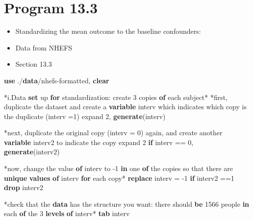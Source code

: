 \documentclass[
  10pt,
]{book}
\newenvironment{Shaded}{\begin{snugshade}}{\end{snugshade}}
\newcommand{\KeywordTok}[1]{\textcolor[rgb]{0.13,0.29,0.53}{\textbf{#1}}}
\newcommand{\NormalTok}[1]{#1}
\newcommand{\OtherTok}[1]{\textcolor[rgb]{0.56,0.35,0.01}{#1}}
\providecommand{\tightlist}{%
  \setlength{\itemsep}{0pt}\setlength{\parskip}{0pt}}
\begin{document}
\hypertarget{program-13.3-1}{%
\section{Program 13.3}\label{program-13.3-1}}

\begin{itemize}
\tightlist
\item
  Standardizing the mean outcome to the baseline confounders:
\item
  Data from NHEFS
\item
  Section 13.3
\end{itemize}

\begin{Shaded}
\begin{Highlighting}[]
\KeywordTok{use}\NormalTok{ ./}\KeywordTok{data}\NormalTok{/nhefs{-}formatted, }\KeywordTok{clear}

\NormalTok{*i.Data }\KeywordTok{set}\NormalTok{ up }\KeywordTok{for}\NormalTok{ standardization: create 3 copies }\KeywordTok{of}\NormalTok{ each subject*}
\NormalTok{*first, duplicate the dataset and create a }\KeywordTok{variable}\NormalTok{ \textquotesingle{}interv\textquotesingle{} which indicates which copy is the duplicate (interv =1)}
\NormalTok{expand 2, }\KeywordTok{generate}\NormalTok{(interv)}

\NormalTok{*next, duplicate the original copy (interv = 0) again, and create another }\KeywordTok{variable}\NormalTok{ \textquotesingle{}interv2\textquotesingle{} to indicate the copy}
\NormalTok{expand 2 }\KeywordTok{if}\NormalTok{ interv == 0, }\KeywordTok{generate}\NormalTok{(interv2)}

\NormalTok{*now, change the }\OtherTok{value} \KeywordTok{of}\NormalTok{ \textquotesingle{}interv\textquotesingle{} to {-}1 }\KeywordTok{in}\NormalTok{ one }\KeywordTok{of}\NormalTok{ the copies so that there are }\KeywordTok{unique} \KeywordTok{values} \KeywordTok{of}\NormalTok{ interv }\KeywordTok{for}\NormalTok{ each copy*}
\KeywordTok{replace}\NormalTok{ interv = {-}1  }\KeywordTok{if}\NormalTok{ interv2 ==1}
\KeywordTok{drop}\NormalTok{ interv2 }

\NormalTok{*check that the }\KeywordTok{data}\NormalTok{ has the structure you want: there should }\KeywordTok{be}\NormalTok{ 1566 people }\KeywordTok{in}\NormalTok{ each }\KeywordTok{of}\NormalTok{ the 3 }\KeywordTok{levels} \KeywordTok{of}\NormalTok{ interv*}
\KeywordTok{tab}\NormalTok{ interv}


\end{Highlighting}
\end{Shaded}
\end{document}
